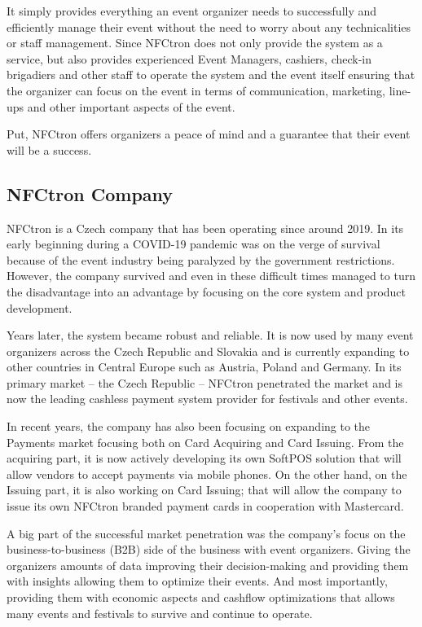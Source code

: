 It simply provides everything an event organizer needs to successfully and efficiently manage their event without the need to worry about any technicalities or staff management.
Since NFCtron does not only provide the system as a service, but also provides experienced Event Managers, cashiers, check-in brigadiers and other staff to operate the system and the event itself ensuring that the organizer can focus on the event in terms of communication, marketing, line-ups and other important aspects of the event.

Put, NFCtron offers organizers a peace of mind and a guarantee that their event will be a success.

\subsection*{NFCtron Company}
\label{subsec:introduction-background-motivation-nfctron}
NFCtron is a Czech company that has been operating since around 2019.
In its early beginning during a COVID-19 pandemic was on the verge of survival because of the event industry being paralyzed by the government restrictions.
However, the company survived and even in these difficult times managed to turn the disadvantage into an advantage by focusing on the core system and product development\cite{nfctron_en_about_us}.

Years later, the system became robust and reliable.
It is now used by many event organizers across the Czech Republic and Slovakia and is currently expanding to other countries in Central Europe such as Austria\cite{nfctron_blog_nfctron_austria_events_festivals_september_visitors_payments}, Poland and Germany.
In its primary market – the Czech Republic – NFCtron penetrated the market and is now the leading cashless payment system provider for festivals and other events.

In recent years, the company has also been focusing on expanding to the Payments market focusing both on Card Acquiring and Card Issuing.
From the acquiring part, it is now actively developing its own SoftPOS solution that will allow vendors to accept payments via mobile phones.
On the other hand, on the Issuing part, it is also working on Card Issuing; that will allow the company to issue its own NFCtron branded payment cards in cooperation with Mastercard\cite{nfctron_blog_nfctron_keynote_mastercard_cashless_event}.

A big part of the successful market penetration was the company's focus on the business-to-business (B2B) side of the business with event organizers.
Giving the organizers amounts of data improving their decision-making and providing them with insights allowing them to optimize their events.
And most importantly, providing them with economic aspects and cashflow optimizations that allows many events and festivals to survive and continue to operate.

